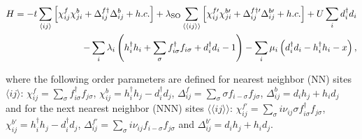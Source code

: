 \documentclass[aps,prb,twocolumn,superscriptaddress,showpacs]{revtex4-1}
\begin{document}
\begin{widetext}
\begin{eqnarray}
\label{KMH-model3}
H=-t \sum_{\langle ij \rangle} \left[\chi^f_{ij}\chi^b_{ji}+\Delta^{f\dag}_{ij}\Delta^{b}_{ij}+h.c.\right ]+ \lambda_{\rm{SO}} \sum_{\langle\langle ij \rangle\rangle} \left[\chi^{f\prime}_{ij}\chi^{b\prime}_{ji}+\Delta^{f\dag\prime}_{ij}\Delta^{b\prime}_{ij}+h.c.\right ]+U\sum_i d^{\dag}_id_i \nonumber \\
 - \sum_{i}\lambda_i\left (h^{\dag}_i h_i+\sum_\sigma f^{\dag}_{i\sigma}f_{i\sigma}+d^{\dag}_i d_i-1 \right)
-\sum_{i}\mu_i\left(  d^{\dag}_id_i - h^{\dag}_ih_i -x \right ),
\end{eqnarray}
\end{widetext}
where the following order parameters are defined for nearest neighbor (NN) sites $\langle ij \rangle$: $\chi^{f}_{ij}=\sum_\sigma f^{\dag}_{i\sigma}f_{j\sigma}$, $
\chi^{b}_{ij}=h^{\dag}_{i}h_{j}-d^{\dag}_{i}d_{j}$,
$\Delta^{f}_{ij}=\sum_\sigma \sigma f_{i-\sigma}f_{j\sigma}$, $\Delta^{b}_{ij}= d_{i}h_{j}+h_id_j$ and for the next nearest neighbor (NNN) sites $\langle\langle ij \rangle\rangle$: $\chi^{f\prime}_{ij}=\sum_\sigma i\nu_{ij} \sigma f^{\dag}_{i\sigma}f_{j\sigma} $, $\chi^{b\prime}_{ij}=h^{\dag}_{i}h_{j}-d^{\dag}_{i}d_{j}$,
$\Delta^{f\prime}_{ij}=\sum_\sigma i\nu_{ij} f_{i-\sigma}f_{j\sigma} $ and
$\Delta^{b\prime}_{ij}= d_{i}h_{j}+h_id_j $.
\end{document}
